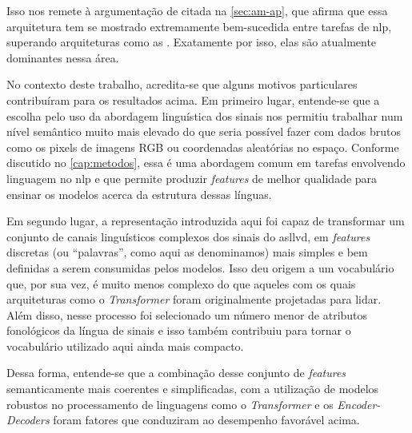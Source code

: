 Isso nos remete à argumentação de  citada na \autoref{sec:am-ap}, que afirma que essa arquitetura tem se mostrado extremamente bem-sucedida entre tarefas de \acrfull{nlp}, superando arquiteturas como as . Exatamente por isso, elas são atualmente dominantes nessa área.

No contexto deste trabalho, acredita-se que alguns motivos particulares contribuíram para os resultados acima.
Em primeiro lugar, entende-se que a escolha pelo uso da abordagem linguística dos sinais nos permitiu trabalhar num nível semântico muito mais elevado do que seria possível fazer com dados brutos como os pixels de imagens RGB ou coordenadas aleatórias no espaço. Conforme discutido no \autoref{cap:metodos}, essa é uma abordagem comum em tarefas envolvendo linguagem no \acrshort{nlp} e que permite produzir \textit{features} de melhor qualidade para ensinar os modelos acerca da estrutura dessas línguas.

Em segundo lugar, a representação introduzida aqui foi capaz de transformar um conjunto de canais linguísticos complexos dos sinais do \acrshort{asllvd}, em \textit{features} discretas (ou ``palavras'', como aqui as denominamos) mais simples e bem definidas a serem consumidas pelos modelos.
Isso deu origem a um vocabulário que, por sua vez, é muito menos complexo do que aqueles com os quais arquiteturas como o \textit{Transformer} foram originalmente projetadas para lidar. Além disso, nesse processo foi selecionado um número menor de atributos fonológicos da língua de sinais e isso também contribuiu para tornar o vocabulário utilizado aqui ainda mais compacto.

Dessa forma, entende-se que a combinação desse conjunto de \textit{features} semanticamente mais coerentes e simplificadas, com a utilização de modelos robustos no processamento de linguagens como o \textit{Transformer} e os \textit{Encoder-Decoders} foram fatores que conduziram ao desempenho favorável acima.













